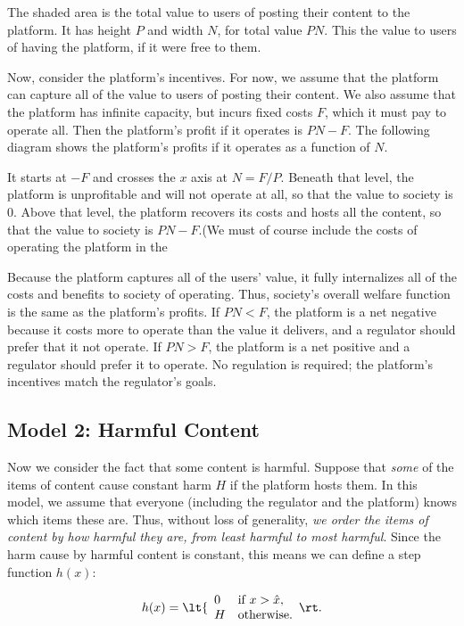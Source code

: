 
The shaded area is the total value to users of posting their content to the platform. It has height $P$ and width $N$, for total value $PN$. This the value to users of having the platform, if it were free to them.

Now, consider the platform's incentives. For now, we assume that the platform can capture all of the value to users of posting their content. We also assume that the platform has infinite capacity, but incurs fixed costs $F$, which it must pay to operate all. Then the platform's profit if it operates is $PN - F$. The following diagram shows the platform's profits if it operates as a function of $N$.


It starts at $-F$ and crosses the $x$ axis at $N = F/P$. Beneath that level, the platform is unprofitable and will not operate at all, so that the value to society is $0$. Above that level, the platform recovers its costs and hosts all the content, so that the value to society is $PN - F $.(We must of course include the costs of operating the platform in the 

Because the platform captures all of the users' value, it fully internalizes all of the costs and benefits to society of operating. Thus, society's overall welfare function is the same as the platform's profits. If $PN < F$, the platform is a net negative because it costs more to operate than the value it delivers, and a regulator should prefer that it not operate. If $PN > F$, the platform is a net positive and a regulator should prefer it to operate. No regulation is required; the platform's incentives match the regulator's goals.

\subsection{Model 2: Harmful Content}
 
Now we consider the fact that some content is harmful. Suppose that \emph{some} of the items of content cause constant harm $H$ if the platform hosts them. In this model, we assume that everyone (including the regulator and the platform) knows which items these are. Thus, without loss of generality, \emph{we order the items of content by how harmful they are, from least harmful to most harmful}. Since the harm cause by harmful content is constant, this means we can define a step function $h(x)$:

\begin{equation}
h(x)=
\lt\{\begin{array}{ll}
	0 & \mbox{if $x>\hat{x}$}, \\
	H & \mbox{otherwise}.
\end{array}\rt.
\end{equation}

